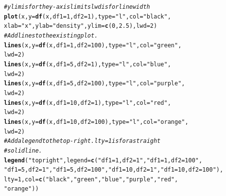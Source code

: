 \documentclass[oneside]{book}\usepackage[]{graphicx}\usepackage[dvipsnames,table,xcdraw]{xcolor}
\makeatletter
\newcommand{\hlnum}[1]{\textcolor[rgb]{0.686,0.059,0.569}{#1}}%
\newcommand{\hlstr}[1]{\textcolor[rgb]{0.192,0.494,0.8}{#1}}%
\newcommand{\hlcom}[1]{\textcolor[rgb]{0.678,0.584,0.686}{\textit{#1}}}%
\newcommand{\hlstd}[1]{\textcolor[rgb]{0.345,0.345,0.345}{#1}}%
\newcommand{\hlkwc}[1]{\textcolor[rgb]{0.333,0.667,0.333}{#1}}%
\newcommand{\hlkwd}[1]{\textcolor[rgb]{0.737,0.353,0.396}{\textbf{#1}}}%
\newenvironment{kframe}{%
 \def\at@end@of@kframe{}%
 \ifinner\ifhmode%
  \def\at@end@of@kframe{\end{minipage}}%
  \begin{minipage}{\columnwidth}%
 \fi\fi%
 \def\FrameCommand##1{\hskip\@totalleftmargin \hskip-\fboxsep
 \colorbox{shadecolor}{##1}\hskip-\fboxsep
     \hskip-\linewidth \hskip-\@totalleftmargin \hskip\columnwidth}%
 \MakeFramed {\advance\hsize-\width
   \@totalleftmargin\z@ \linewidth\hsize
   \@setminipage}}%
 {\par\unskip\endMakeFramed%
 \at@end@of@kframe}
\newenvironment{knitrout}{}{} %
\makeatother
\begin{document}
\begin{knitrout}
\begin{kframe}\begin{alltt}
\hlcom{# ylim is for the y-axis limits lwd is for line width}
\hlkwd{plot}\hlstd{(x,} \hlkwc{y} \hlstd{=} \hlkwd{df}\hlstd{(x,} \hlkwc{df1} \hlstd{=} \hlnum{1}\hlstd{,} \hlkwc{df2} \hlstd{=} \hlnum{1}\hlstd{),} \hlkwc{type} \hlstd{=} \hlstr{"l"}\hlstd{,} \hlkwc{col} \hlstd{=} \hlstr{"black"}\hlstd{,}
  \hlkwc{xlab} \hlstd{=} \hlstr{"x"}\hlstd{,} \hlkwc{ylab} \hlstd{=} \hlstr{"density"}\hlstd{,} \hlkwc{ylim} \hlstd{=} \hlkwd{c}\hlstd{(}\hlnum{0}\hlstd{,} \hlnum{2.5}\hlstd{),} \hlkwc{lwd} \hlstd{=} \hlnum{2}\hlstd{)}
\hlcom{# Add lines to the existing plot.}
\hlkwd{lines}\hlstd{(x,} \hlkwc{y} \hlstd{=} \hlkwd{df}\hlstd{(x,} \hlkwc{df1} \hlstd{=} \hlnum{1}\hlstd{,} \hlkwc{df2} \hlstd{=} \hlnum{100}\hlstd{),} \hlkwc{type} \hlstd{=} \hlstr{"l"}\hlstd{,} \hlkwc{col} \hlstd{=} \hlstr{"green"}\hlstd{,}
  \hlkwc{lwd} \hlstd{=} \hlnum{2}\hlstd{)}
\hlkwd{lines}\hlstd{(x,} \hlkwc{y} \hlstd{=} \hlkwd{df}\hlstd{(x,} \hlkwc{df1} \hlstd{=} \hlnum{5}\hlstd{,} \hlkwc{df2} \hlstd{=} \hlnum{1}\hlstd{),} \hlkwc{type} \hlstd{=} \hlstr{"l"}\hlstd{,} \hlkwc{col} \hlstd{=} \hlstr{"blue"}\hlstd{,}
  \hlkwc{lwd} \hlstd{=} \hlnum{2}\hlstd{)}
\hlkwd{lines}\hlstd{(x,} \hlkwc{y} \hlstd{=} \hlkwd{df}\hlstd{(x,} \hlkwc{df1} \hlstd{=} \hlnum{5}\hlstd{,} \hlkwc{df2} \hlstd{=} \hlnum{100}\hlstd{),} \hlkwc{type} \hlstd{=} \hlstr{"l"}\hlstd{,} \hlkwc{col} \hlstd{=} \hlstr{"purple"}\hlstd{,}
  \hlkwc{lwd} \hlstd{=} \hlnum{2}\hlstd{)}
\hlkwd{lines}\hlstd{(x,} \hlkwc{y} \hlstd{=} \hlkwd{df}\hlstd{(x,} \hlkwc{df1} \hlstd{=} \hlnum{10}\hlstd{,} \hlkwc{df2} \hlstd{=} \hlnum{1}\hlstd{),} \hlkwc{type} \hlstd{=} \hlstr{"l"}\hlstd{,} \hlkwc{col} \hlstd{=} \hlstr{"red"}\hlstd{,}
  \hlkwc{lwd} \hlstd{=} \hlnum{2}\hlstd{)}
\hlkwd{lines}\hlstd{(x,} \hlkwc{y} \hlstd{=} \hlkwd{df}\hlstd{(x,} \hlkwc{df1} \hlstd{=} \hlnum{10}\hlstd{,} \hlkwc{df2} \hlstd{=} \hlnum{100}\hlstd{),} \hlkwc{type} \hlstd{=} \hlstr{"l"}\hlstd{,} \hlkwc{col} \hlstd{=} \hlstr{"orange"}\hlstd{,}
  \hlkwc{lwd} \hlstd{=} \hlnum{2}\hlstd{)}
\hlcom{# Add a legend to the top-right.  lty = 1 is for a straight}
\hlcom{# solid line.}
\hlkwd{legend}\hlstd{(}\hlstr{"topright"}\hlstd{,} \hlkwc{legend} \hlstd{=} \hlkwd{c}\hlstd{(}\hlstr{"df1=1, df2=1"}\hlstd{,} \hlstr{"df1=1, df2=100"}\hlstd{,}
  \hlstr{"df1=5, df2=1"}\hlstd{,} \hlstr{"df1=5, df2=100"}\hlstd{,} \hlstr{"df1=10, df2=1"}\hlstd{,} \hlstr{"df1=10, df2=100"}\hlstd{),}
  \hlkwc{lty} \hlstd{=} \hlnum{1}\hlstd{,} \hlkwc{col} \hlstd{=} \hlkwd{c}\hlstd{(}\hlstr{"black"}\hlstd{,} \hlstr{"green"}\hlstd{,} \hlstr{"blue"}\hlstd{,} \hlstr{"purple"}\hlstd{,} \hlstr{"red"}\hlstd{,}
    \hlstr{"orange"}\hlstd{))}
\end{alltt}
\end{kframe}


\end{knitrout}
\end{document}
